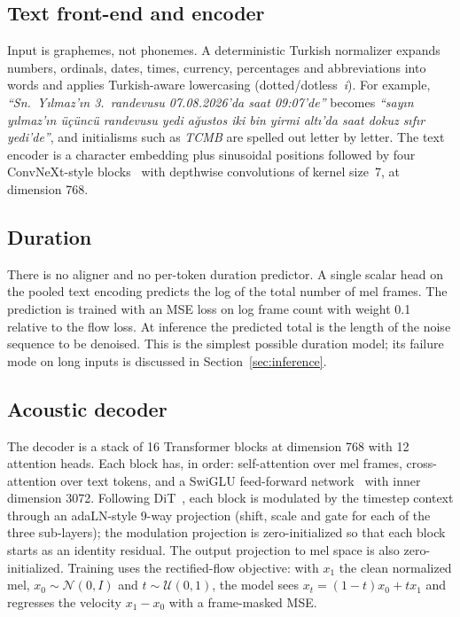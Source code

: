 \documentclass[10pt,twocolumn]{article}
\begin{document}
\subsection{Text front-end and encoder}

Input is graphemes, not phonemes. A deterministic Turkish normalizer expands numbers, ordinals, dates, times, currency, percentages and abbreviations into words and applies Turkish-aware lowercasing (dotted/dotless~\textit{i}). For example, \textit{``Sn.\ Yılmaz'ın 3.\ randevusu 07.08.2026'da saat 09:07'de''} becomes \textit{``sayın yılmaz'ın üçüncü randevusu yedi ağustos iki bin yirmi altı'da saat dokuz sıfır yedi'de''}, and initialisms such as \textit{TCMB} are spelled out letter by letter. The text encoder is a character embedding plus sinusoidal positions followed by four ConvNeXt-style blocks~\citep{liu2022convnext} with depthwise convolutions of kernel size~7, at dimension 768.

\subsection{Duration}

There is no aligner and no per-token duration predictor. A single scalar head on the pooled text encoding predicts the log of the total number of mel frames. The prediction is trained with an MSE loss on log frame count with weight 0.1 relative to the flow loss. At inference the predicted total is the length of the noise sequence to be denoised. This is the simplest possible duration model; its failure mode on long inputs is discussed in Section~\ref{sec:inference}.

\subsection{Acoustic decoder}

The decoder is a stack of 16 Transformer blocks at dimension 768 with 12 attention heads. Each block has, in order: self-attention over mel frames, cross-attention over text tokens, and a SwiGLU feed-forward network~\citep{shazeer2020glu} with inner dimension 3072. Following DiT~\citep{peebles2023dit}, each block is modulated by the timestep context through an adaLN-style 9-way projection (shift, scale and gate for each of the three sub-layers); the modulation projection is zero-initialized so that each block starts as an identity residual. The output projection to mel space is also zero-initialized. Training uses the rectified-flow objective: with $x_1$ the clean normalized mel, $x_0 \sim \mathcal{N}(0, I)$ and $t \sim \mathcal{U}(0,1)$, the model sees $x_t = (1-t)x_0 + t x_1$ and regresses the velocity $x_1 - x_0$ with a frame-masked MSE.
\end{document}
